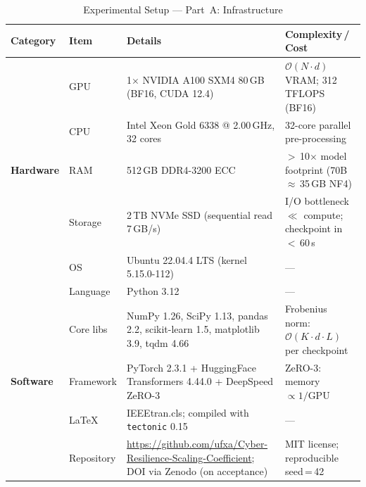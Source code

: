 
\begin{table}[t]
\caption{Experimental Setup --- Part~A: Infrastructure}
\label{tab:setup_infra}
\begin{tabularx}{\textwidth}{@{} p{1.9cm} p{2.4cm} X p{4.5cm} @{}}
\toprule
\textbf{Category} & \textbf{Item} & \textbf{Details} & \textbf{Complexity\,/\,Cost} \\
\midrule

\multirow{5}{*}{\textbf{Hardware}}
  & GPU     & 1$\times$ NVIDIA A100 SXM4 80\,GB (BF16, CUDA 12.4)
            & $\mathcal{O}(N \cdot d)$ VRAM; 312\,TFLOPS (BF16) \\
  & CPU     & Intel Xeon Gold 6338 @ 2.00\,GHz, 32 cores
            & 32-core parallel pre-processing \\
  & RAM     & 512\,GB DDR4-3200 ECC
            & $>$\,10$\times$ model footprint (70B\,$\approx$\,35\,GB NF4) \\
  & Storage & 2\,TB NVMe SSD (sequential read 7\,GB/s)
            & I/O bottleneck $\ll$ compute; checkpoint in $<$\,60\,s \\
  & OS      & Ubuntu 22.04.4 LTS (kernel 5.15.0-112)
            & --- \\
\midrule

\multirow{5}{*}{\textbf{Software}}
  & Language    & Python 3.12
            & --- \\
  & Core libs   & NumPy 1.26, SciPy 1.13, pandas 2.2, scikit-learn 1.5, matplotlib 3.9, tqdm 4.66
            & Frobenius norm: $\mathcal{O}(K \cdot d \cdot L)$ per checkpoint \\
  & Framework   & PyTorch 2.3.1 + HuggingFace Transformers 4.44.0 + DeepSpeed ZeRO-3
            & ZeRO-3: memory $\propto 1/\text{GPU}$ \\
  & LaTeX       & IEEEtran.cls; compiled with \texttt{tectonic} 0.15
            & --- \\
  & Repository  & \url{https://github.com/ufxa/Cyber-Resilience-Scaling-Coefficient}; DOI via Zenodo (on acceptance)
            & MIT license; reproducible seed\,=\,42 \\

\bottomrule
\end{tabularx}
\end{table}

